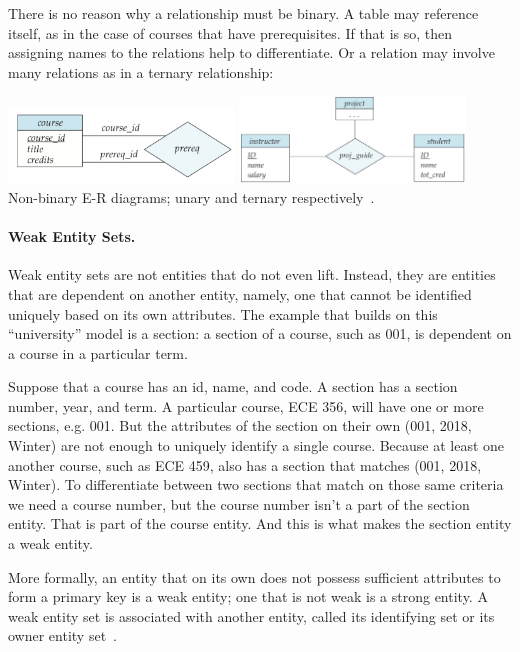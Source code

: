 There is no reason why a relationship must be binary. A table may reference itself, as in the case of courses that have prerequisites. If that is so, then assigning names to the relations help to differentiate. Or a relation may involve many relations as in a ternary relationship:

\begin{center}
\includegraphics[width=0.45\textwidth]{images/prereq}
\includegraphics[width=0.45\textwidth]{images/er-ternary}\\
Non-binary E-R diagrams; unary and ternary respectively~\cite{dsc}.
\end{center}

\paragraph{Weak Entity Sets.} Weak entity sets are not entities that do not even lift. Instead, they are entities that are dependent on another entity, namely, one that cannot be identified uniquely based on its own attributes. The example that builds on this ``university'' model is a section: a section of a course, such as 001, is dependent on a course in a particular term. 

Suppose that a course has an id, name, and code. A section has a section number, year, and term. A particular course, ECE 356, will have one or more sections, e.g. 001. But the attributes of the section on their own (001, 2018, Winter) are not enough to uniquely identify a single course. Because at least one another course, such as ECE 459, also has a section that matches (001, 2018, Winter). To differentiate between two sections that match on those same criteria we need a course number, but the course number isn't a part of the section entity. That is part of the course entity. And this is what makes the section entity a weak entity.

More formally, an entity that on its own does not possess sufficient attributes to form a primary key is a weak entity; one that is not weak is a strong entity. A weak entity set is associated with another entity, called its identifying set or its owner entity set~\cite{dsc}.

